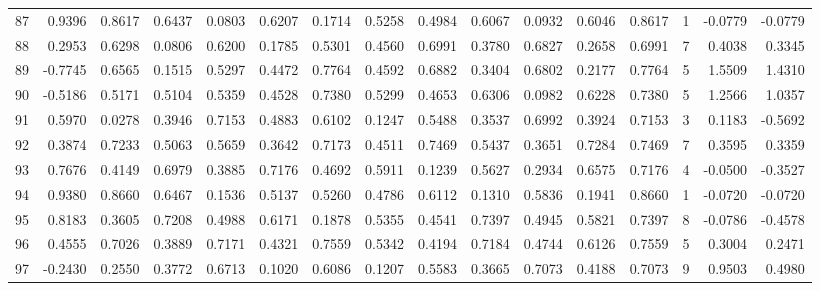 \begin{tabular}{lrrrrrrrrrrrrrrr}
87  &      0.9396 &  0.8617 &  0.6437 &  0.0803 &  0.6207 &  0.1714 &  0.5258 &  0.4984 &  0.6067 &  0.0932 &   0.6046 &     0.8617 &      1 &                   -0.0779 &                    -0.0779 \\
88  &      0.2953 &  0.6298 &  0.0806 &  0.6200 &  0.1785 &  0.5301 &  0.4560 &  0.6991 &  0.3780 &  0.6827 &   0.2658 &     0.6991 &      7 &                    0.4038 &                     0.3345 \\
89  &     -0.7745 &  0.6565 &  0.1515 &  0.5297 &  0.4472 &  0.7764 &  0.4592 &  0.6882 &  0.3404 &  0.6802 &   0.2177 &     0.7764 &      5 &                    1.5509 &                     1.4310 \\
90  &     -0.5186 &  0.5171 &  0.5104 &  0.5359 &  0.4528 &  0.7380 &  0.5299 &  0.4653 &  0.6306 &  0.0982 &   0.6228 &     0.7380 &      5 &                    1.2566 &                     1.0357 \\
91  &      0.5970 &  0.0278 &  0.3946 &  0.7153 &  0.4883 &  0.6102 &  0.1247 &  0.5488 &  0.3537 &  0.6992 &   0.3924 &     0.7153 &      3 &                    0.1183 &                    -0.5692 \\
92  &      0.3874 &  0.7233 &  0.5063 &  0.5659 &  0.3642 &  0.7173 &  0.4511 &  0.7469 &  0.5437 &  0.3651 &   0.7284 &     0.7469 &      7 &                    0.3595 &                     0.3359 \\
93  &      0.7676 &  0.4149 &  0.6979 &  0.3885 &  0.7176 &  0.4692 &  0.5911 &  0.1239 &  0.5627 &  0.2934 &   0.6575 &     0.7176 &      4 &                   -0.0500 &                    -0.3527 \\
94  &      0.9380 &  0.8660 &  0.6467 &  0.1536 &  0.5137 &  0.5260 &  0.4786 &  0.6112 &  0.1310 &  0.5836 &   0.1941 &     0.8660 &      1 &                   -0.0720 &                    -0.0720 \\
95  &      0.8183 &  0.3605 &  0.7208 &  0.4988 &  0.6171 &  0.1878 &  0.5355 &  0.4541 &  0.7397 &  0.4945 &   0.5821 &     0.7397 &      8 &                   -0.0786 &                    -0.4578 \\
96  &      0.4555 &  0.7026 &  0.3889 &  0.7171 &  0.4321 &  0.7559 &  0.5342 &  0.4194 &  0.7184 &  0.4744 &   0.6126 &     0.7559 &      5 &                    0.3004 &                     0.2471 \\
97  &     -0.2430 &  0.2550 &  0.3772 &  0.6713 &  0.1020 &  0.6086 &  0.1207 &  0.5583 &  0.3665 &  0.7073 &   0.4188 &     0.7073 &      9 &                    0.9503 &                     0.4980 \\

\end{tabular}
